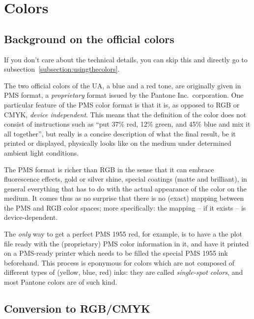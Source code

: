 \section{Colors}

\subsection{Background on the official colors}

\begin{note}
If you don't care about the technical details, you can skip this and directly
go to subsection~\ref{subsection:usingthecolors}.
\end{note}

The two official colors of the UA, a blue and a red tone, are originally given
in PMS format, a \emph{proprietary} format issued by the Pantone Inc.\
corporation. One particular feature of the PMS color format is that it is, as
opposed to RGB or CMYK, \emph{device independent}. This means that the
definition of the color does not consist of instructions such as \enquote{put
  37\% red, 12\% green, and 45\% blue and mix it all together}, but really is a
  concise description of what the final result, be it printed or displayed,
  physically looks like on the medium under determined ambient light
  conditions.

The PMS format is richer than RGB in the sense that it can embrace fluorescence
effects, gold or silver shine, special coatings (matte and brilliant), in
general everything that has to do with the actual appearance of the color on
the medium. It comes thus as no surprise that there is no (exact) mapping
between the PMS and RGB color spaces; more specifically: the mapping -- if it
exists -- is device-dependent.

The \emph{only} way to get a perfect PMS 1955 red, for example, is to have a
the plot file ready with the (proprietary) PMS color information in it, and
have it printed on a PMS-ready printer which needs to be filled the special PMS
1955 ink beforehand. This process is eponymous for colors which are not
composed of different types of (yellow, blue, red) inks: they are called
\emph{single-spot colors}, and most Pantone\textsuperscript{\textregistered}
colors are of such kind.


\subsection{Conversion to RGB/CMYK}

